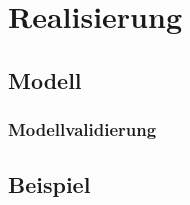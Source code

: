 \chapter{Realisierung}
\label{chapter:realisierung}
\section{Modell}
\subsection{Modellvalidierung}
\section{Beispiel}
